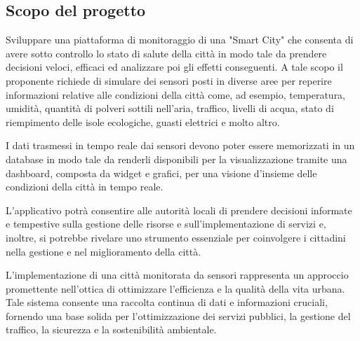 \subsection{Scopo del progetto}
Sviluppare una piattaforma di monitoraggio di una "Smart City" che consenta di avere sotto controllo lo stato di salute della città in modo tale da prendere decisioni veloci, efficaci ed analizzare poi gli effetti conseguenti. A tale scopo il proponente richiede di simulare dei sensori posti in diverse aree per reperire informazioni relative alle condizioni della città come, ad esempio, temperatura, umidità, quantità di polveri sottili nell’aria, traffico, livelli di acqua, stato di riempimento delle isole ecologiche, guasti elettrici e molto altro.

I dati trasmessi in tempo reale dai sensori devono poter essere memorizzati in un database in modo tale da renderli disponibili per la visualizzazione tramite una dashboard, composta da widget e grafici, per una visione d’insieme delle condizioni della città in tempo reale.

L’applicativo potrà consentire alle autorità locali di prendere decisioni informate e tempestive sulla gestione delle risorse e sull’implementazione di servizi e, inoltre, si potrebbe rivelare uno strumento essenziale per coinvolgere i cittadini nella gestione e nel miglioramento della città.

L’implementazione di una città monitorata da sensori rappresenta un approccio promettente nell’ottica di ottimizzare l’efficienza e la qualità della vita urbana. Tale sistema consente una raccolta continua di dati e informazioni cruciali, fornendo una base solida per l’ottimizzazione
dei servizi pubblici, la gestione del traffico, la sicurezza e la sostenibilità ambientale.
